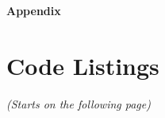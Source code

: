 \newpage
\appendix
\begin{center}
    \LARGE{\textbf{Appendix}}
\end{center}

\section{Code Listings}
\textit{(Starts on the following page)}







